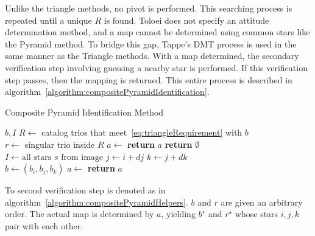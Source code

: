 Unlike the triangle methods, no pivot is performed.
This searching process is repeated until a unique $R$ is found.
Toloei does not specify an attitude determination method, and a map cannot be determined using common
stars like the Pyramid method.
To bridge this gap, Tappe's DMT process is used in the same manner as the Triangle methods.
With a map determined, the secondary verification step involving guessing a nearby star is performed.
If this verification step passes, then the mapping is returned.
This entire process is described in algorithm~\ref{algorithm:compositePyramidIdentification}.

\begin{algorithm}
    \caption{Composite Pyramid Identification Method} \label{algorithm:compositePyramidIdentification}
    \begin{algorithmic}[1]
         {$b, I$}
        \State $R \gets $ catalog trios that meet~\eqref{eq:triangleRequirement} with $b$
        \\
        \State $r \gets $ singular trio inside $R$
        \State $a \gets $ 
        \State \textbf{return} $a$
        \EndIf
        \EndIf
        \State \textbf{return } $\emptyset$
        \EndFunction
        \\
        \State $I \gets \text{all stars } s \text{ from image}$
        \State $j \gets i + dj$
        \State $k \gets j + dk$
        \\
        \State $b \gets (b_i, b_j, b_k)$
        \State $a \gets$ 
        \State \textbf{return} $a$
        \EndIf
        \EndFor
        \EndFor
        \EndFor
        \EndProcedure
    \end{algorithmic}
\end{algorithm}

To second verification step is denoted as  in
algorithm~\ref{algorithm:compositePyramidHelpers}.
$b$ and $r$ are given an arbitrary order.
The actual map is determined by $a$, yielding $b^{\star}$ and $r^{\star}$ whose stars $i, j, k$ pair with each other.

